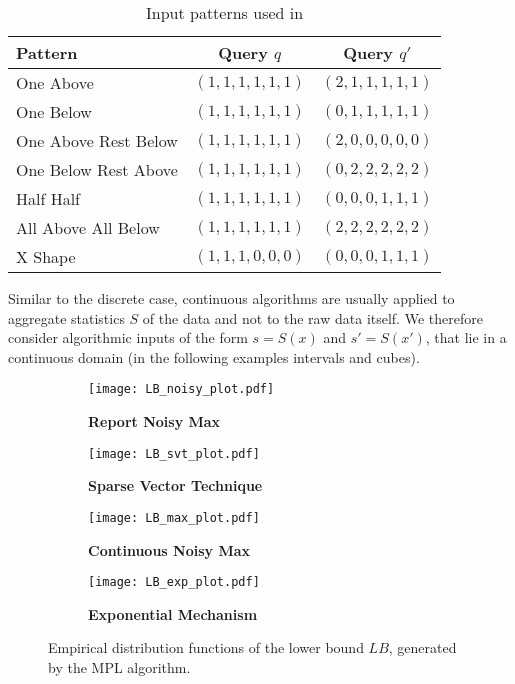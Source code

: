 \documentclass[conference]{IEEEtran}
\begin{document}
\begin{table}[H] 
\begin{center}
\begin{tabular}{l|c|c} 
\toprule
Pattern & Query $q$ & Query $q'$ \\ 
\midrule 
One Above & $(1,1,1,1,1,1)$ & $(2,1,1,1,1,1)$ \\
One Below & $(1,1,1,1,1,1)$ & $(0,1,1,1,1,1)$ \\
One Above Rest Below & $(1,1,1,1,1,1)$ & $(2,0,0,0,0,0)$ \\
One Below Rest Above & $(1,1,1,1,1,1)$ & $(0,2,2,2,2,2)$ \\
Half Half & $(1,1,1,1,1,1)$ & $(0,0,0,1,1,1)$ \\
All Above All Below & $(1,1,1,1,1,1)$ & $(2,2,2,2,2,2)$ \\
X Shape & $(1,1,1,0,0,0)$ & $(0,0,0,1,1,1)$ \\ 
\bottomrule
\end{tabular}
\caption{Input patterns used in \cite{StatDP}}
\label{query_patterns}
\end{center}
\end{table}

Similar to the discrete case, continuous algorithms are usually applied to aggregate statistics $S$ of the data and not to the raw data itself. We therefore consider algorithmic inputs of the form $s=S(x)$ and $s'=S(x')$, that lie in a continuous domain (in the following examples intervals and cubes).



\begin{figure*}[ht]
\begin{subfigure}[c]{.49\linewidth}
\centering
\caption{\textbf{Report Noisy Max}}
\texttt{[image: LB\_noisy\_plot.pdf]}
\label{LB_noisy_plot}
\end{subfigure}\quad
\begin{subfigure}[c]{.49\linewidth}
\centering
\caption{\textbf{Sparse Vector Technique}}
\texttt{[image: LB\_svt\_plot.pdf]}
\label{LB_svt_plot}
\end{subfigure}

\begin{subfigure}[c]{.49\linewidth}
\centering
\caption{\textbf{Continuous Noisy Max}}
\texttt{[image: LB\_max\_plot.pdf]}
\label{LB_max_plot}
\end{subfigure}\quad
\begin{subfigure}[c]{.49\linewidth}
\centering
\caption{\textbf{Exponential Mechanism}}
\texttt{[image: LB\_exp\_plot.pdf]}
\label{LB_exp_plot}
\end{subfigure}\caption{Empirical distribution functions of the lower bound $LB$, generated by the MPL algorithm. \label{Figure_panel}} 
\end{figure*}
\end{document}

